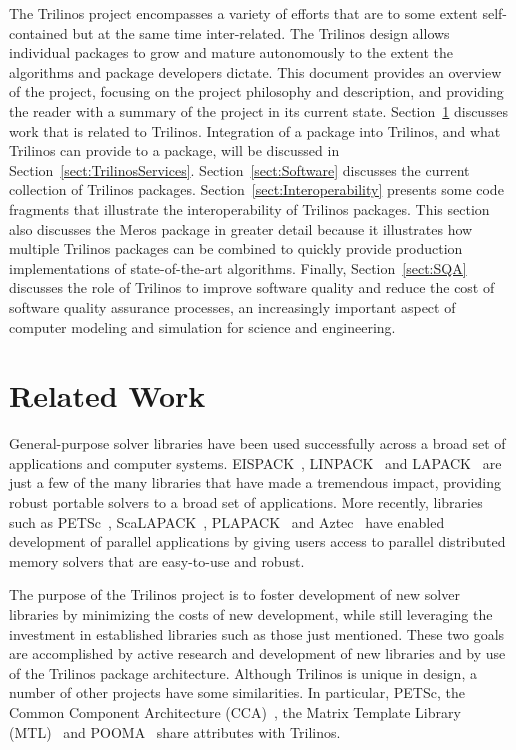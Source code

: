 \documentclass[12pt,relax]{TPA}
\begin{document}
The Trilinos project encompasses a variety of efforts that are to some
extent self-contained but at the same time inter-related.  The
Trilinos design allows individual packages to grow and mature
autonomously to the extent the algorithms and package developers
dictate.  This document provides an overview of the project,
focusing on the project philosophy and description, and
providing the reader with a summary of the project in its current
state. 
Section~\ref{Sect:RelatedWork} discusses work that is related to Trilinos. 
Integration of a package into Trilinos, and what Trilinos can provide
to a package, will be discussed in Section~\ref{sect:TrilinosServices}.
Section~\ref{sect:Software} discusses the current collection of Trilinos
packages.  Section~\ref{sect:Interoperability} presents some code
fragments that illustrate the interoperability of Trilinos packages.
This section also discusses the Meros package in greater detail
because it illustrates how multiple Trilinos packages can be combined 
to quickly provide production implementations of state-of-the-art 
algorithms.  Finally, Section~\ref{sect:SQA} discusses the role of 
Trilinos to improve software quality and reduce the cost of software 
quality assurance processes, an increasingly important aspect
of computer modeling and simulation for science and engineering.  

\section{Related Work}
\label{Sect:RelatedWork}
General-purpose solver libraries have been used successfully across 
a broad set of applications and computer systems.  EISPACK~\cite{eispack}, 
LINPACK~\cite{linpack} and LAPACK~\cite{lapack} are just a few of
the many libraries that have made a tremendous impact, providing robust 
portable solvers to a broad set of applications.  More recently, libraries 
such as PETSc~\cite{petsc-home-page,petsc-manual,petsc-efficient}, 
ScaLAPACK~\cite{scalapack}, PLAPACK~\cite{plapack} 
and Aztec~\cite{Aztec2.1} have enabled development of parallel
applications by giving users access to parallel distributed 
memory solvers that are easy-to-use and robust.

The purpose of the Trilinos project is to foster development
of new solver libraries by minimizing the costs of new development,
while still leveraging the investment in
established libraries such as those just mentioned.  These two goals
are accomplished by active research and development of new libraries
and by use of the Trilinos package architecture.  Although
Trilinos is unique in design, a number of other projects have some 
similarities.  In particular, PETSc, the Common Component Architecture
(CCA)~\cite{CCA-home-page}, the Matrix
Template Library (MTL)~\cite{MTL-home-page} and POOMA~\cite{POOMA}
share attributes with Trilinos.
\end{document}
